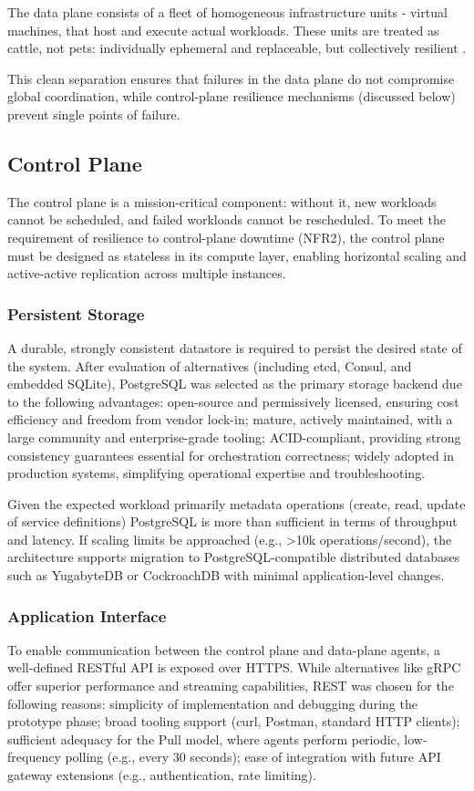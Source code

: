 The data plane consists of a fleet of homogeneous infrastructure units - virtual machines, that host and execute actual workloads. These units are treated as cattle, not pets: individually ephemeral and replaceable, but collectively resilient \cite{pets_vs_cattle}.

This clean separation ensures that failures in the data plane do not compromise global coordination, while control-plane resilience mechanisms (discussed below) prevent single points of failure.

\subsection{Control Plane}

The control plane is a mission-critical component: without it, new workloads cannot be scheduled, and failed workloads cannot be rescheduled. To meet the requirement of resilience to control-plane downtime (NFR2), the control plane must be designed as stateless in its compute layer, enabling horizontal scaling and active-active replication across multiple instances.

\subsubsection{Persistent Storage}
A durable, strongly consistent datastore is required to persist the desired state of the system. After evaluation of alternatives (including etcd, Consul, and embedded SQLite), PostgreSQL was selected as the primary storage backend due to the following advantages: open-source and permissively licensed, ensuring cost efficiency and freedom from vendor lock-in; mature, actively maintained, with a large community and enterprise-grade tooling;
ACID-compliant, providing strong consistency guarantees essential for orchestration correctness; widely adopted in production systems, simplifying operational expertise and troubleshooting.

Given the expected workload primarily metadata operations (create, read, update of service definitions) PostgreSQL is more than sufficient in terms of throughput and latency. If scaling limits be approached (e.g., >10k operations/second), the architecture supports migration to PostgreSQL-compatible distributed databases such as YugabyteDB or CockroachDB with minimal application-level changes.

\subsubsection{Application Interface}
To enable communication between the control plane and data-plane agents, a well-defined RESTful API is exposed over HTTPS. While alternatives like gRPC offer superior performance and streaming capabilities, REST was chosen for the following reasons: simplicity of implementation and debugging during the prototype phase; broad tooling support (curl, Postman, standard HTTP clients); sufficient adequacy for the Pull model, where agents perform periodic, low-frequency polling (e.g., every 30 seconds); ease of integration with future API gateway extensions (e.g., authentication, rate limiting).

